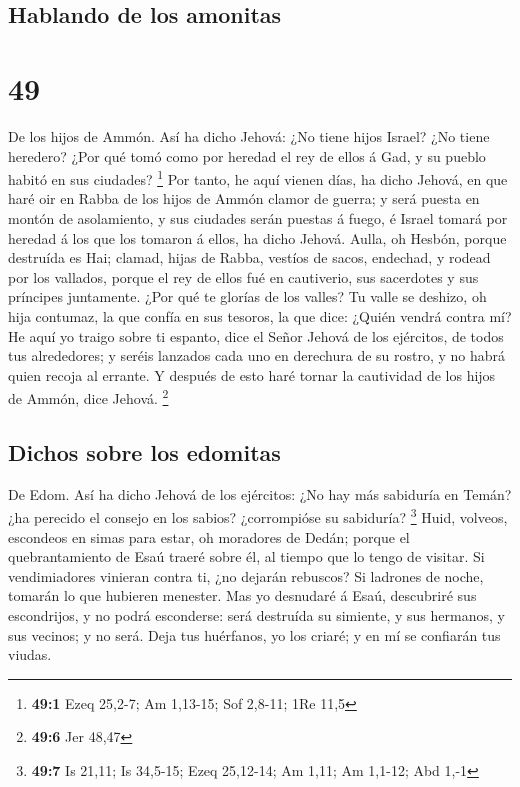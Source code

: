 \hypertarget{hablando-de-los-amonitas}{%
\subsection{Hablando de los amonitas}\label{hablando-de-los-amonitas}}

\hypertarget{section-48}{%
\section{49}\label{section-48}}

 De los hijos de Ammón. Así ha dicho Jehová: ¿No tiene
hijos Israel? ¿No tiene heredero? ¿Por qué tomó como por heredad el rey
de ellos á Gad, y su pueblo habitó en sus ciudades? \footnote{\textbf{49:1}
  Ezeq 25,2-7; Am 1,13-15; Sof 2,8-11; 1Re 11,5}  Por
tanto, he aquí vienen días, ha dicho Jehová, en que haré oir en Rabba de
los hijos de Ammón clamor de guerra; y será puesta en montón de
asolamiento, y sus ciudades serán puestas á fuego, é Israel tomará por
heredad á los que los tomaron á ellos, ha dicho Jehová. 
Aulla, oh Hesbón, porque destruída es Hai; clamad, hijas de Rabba,
vestíos de sacos, endechad, y rodead por los vallados, porque el rey de
ellos fué en cautiverio, sus sacerdotes y sus príncipes juntamente.
 ¿Por qué te glorías de los valles? Tu valle se deshizo,
oh hija contumaz, la que confía en sus tesoros, la que dice: ¿Quién
vendrá contra mí?  He aquí yo traigo sobre ti espanto,
dice el Señor Jehová de los ejércitos, de todos tus alrededores; y
seréis lanzados cada uno en derechura de su rostro, y no habrá quien
recoja al errante.  Y después de esto haré tornar la
cautividad de los hijos de Ammón, dice Jehová. \footnote{\textbf{49:6}
  Jer 48,47}

\hypertarget{dichos-sobre-los-edomitas}{%
\subsection{Dichos sobre los edomitas}\label{dichos-sobre-los-edomitas}}

 De Edom. Así ha dicho Jehová de los ejércitos: ¿No hay
más sabiduría en Temán? ¿ha perecido el consejo en los sabios?
¿corrompióse su sabiduría? \footnote{\textbf{49:7} Is 21,11; Is 34,5-15;
  Ezeq 25,12-14; Am 1,11; Am 1,1-12; Abd 1,-1}  Huid,
volveos, escondeos en simas para estar, oh moradores de Dedán; porque el
quebrantamiento de Esaú traeré sobre él, al tiempo que lo tengo de
visitar.  Si vendimiadores vinieran contra ti, ¿no dejarán
rebuscos? Si ladrones de noche, tomarán lo que hubieren menester.
 Mas yo desnudaré á Esaú, descubriré sus escondrijos, y
no podrá esconderse: será destruída su simiente, y sus hermanos, y sus
vecinos; y no será.  Deja tus huérfanos, yo los criaré; y
en mí se confiarán tus viudas.

